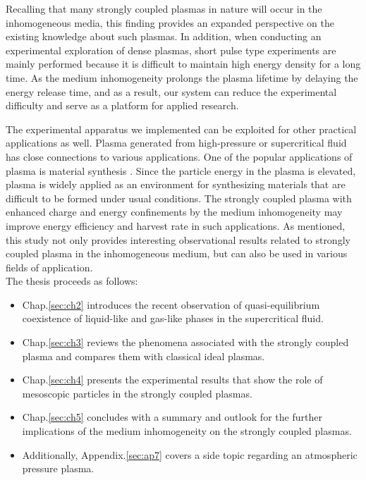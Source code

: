 Recalling that many strongly coupled plasmas in nature will occur in the inhomogeneous media, this finding provides an expanded perspective on the existing knowledge about such plasmas. In addition, when conducting an experimental exploration of dense plasmas, short pulse type experiments are mainly performed because it is difficult to maintain high energy density for a long time. As the medium inhomogeneity prolongs the plasma lifetime by delaying the energy release time, and as a result, our system can reduce the experimental difficulty and serve as a platform for applied research.

The experimental apparatus we implemented can be exploited for other practical applications as well. Plasma generated from high-pressure or supercritical fluid has close connections to various applications. One of the popular applications of plasma is material synthesis \cite{vollath2008plasma, kramer2015cold, stauss2015review}. Since the particle energy in the plasma is elevated, plasma is widely applied as an environment for synthesizing materials that are difficult to be formed under usual conditions. The strongly coupled plasma with enhanced charge and energy confinements by the medium inhomogeneity may improve energy efficiency and harvest rate in such applications. As mentioned, this study not only provides interesting observational results related to strongly coupled plasma in the inhomogeneous medium, but can also be used in various fields of application. \\

The thesis proceeds as follows:
\begin{itemize}
  \item Chap.\ref{sec:ch2} introduces the recent observation of quasi-equilibrium coexistence of liquid-like and gas-like phases in the supercritical fluid.
  \item Chap.\ref{sec:ch3} reviews the phenomena associated with the strongly coupled plasma and compares them with classical ideal plasmas.
  \item Chap.\ref{sec:ch4} presents the experimental results that show the role of mesoscopic particles in the strongly coupled plasmas.
  \item Chap.\ref{sec:ch5} concludes with a summary and outlook for the further implications of the medium inhomogeneity on the strongly coupled plasmas.
  \item Additionally, Appendix.\ref{sec:ap7} covers a side topic regarding an atmospheric pressure plasma.
\end{itemize}
